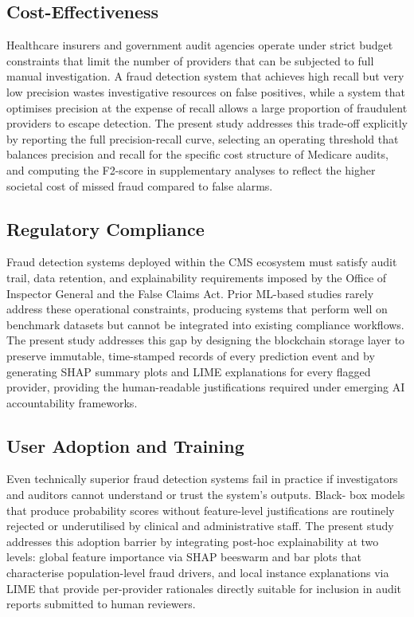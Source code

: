 \subsection{Cost-Effectiveness}

Healthcare insurers and government audit agencies operate under strict budget
constraints that limit the number of providers that can be subjected to full
manual investigation. A fraud detection system that achieves high recall but very
low precision wastes investigative resources on false positives, while a system
that optimises precision at the expense of recall allows a large proportion of
fraudulent providers to escape detection. The present study addresses this
trade-off explicitly by reporting the full precision-recall curve, selecting an
operating threshold that balances precision and recall for the specific cost
structure of Medicare audits, and computing the F2-score in supplementary
analyses to reflect the higher societal cost of missed fraud compared to false
alarms.

\subsection{Regulatory Compliance}

Fraud detection systems deployed within the CMS ecosystem must satisfy audit
trail, data retention, and explainability requirements imposed by the Office of
Inspector General and the False Claims Act. Prior ML-based studies rarely address
these operational constraints, producing systems that perform well on benchmark
datasets but cannot be integrated into existing compliance workflows. The present
study addresses this gap by designing the blockchain storage layer to preserve
immutable, time-stamped records of every prediction event and by generating SHAP
summary plots and LIME explanations for every flagged provider, providing the
human-readable justifications required under emerging AI accountability
frameworks.

\subsection{User Adoption and Training}

Even technically superior fraud detection systems fail in practice if
investigators and auditors cannot understand or trust the system's outputs. Black-
box models that produce probability scores without feature-level justifications
are routinely rejected or underutilised by clinical and administrative staff.
The present study addresses this adoption barrier by integrating post-hoc
explainability at two levels: global feature importance via SHAP beeswarm and
bar plots that characterise population-level fraud drivers, and local instance
explanations via LIME that provide per-provider rationales directly suitable for
inclusion in audit reports submitted to human reviewers.

